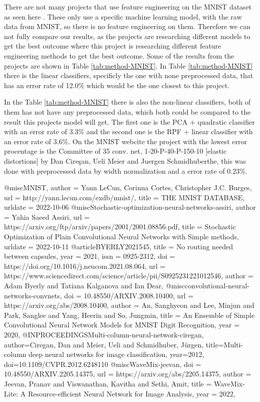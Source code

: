 There are not many projects that use feature engineering on the MNIST dataset as seen here \cite{Stochastic-optimization-neural-networks-assiri, BYERLY2021545, convolutional-neural-networks-convnets, Multi-column-neural-network-ciregan, WaveMix-jeevan}. These only use a specific machine learning model, with the raw data from MNIST, so there is no feature engineering on them. Therefore we can not fully compare our results, as the projects are researching different models to get the best outcome where this project is researching different feature engineering methods to get the best outcome. Some of the results from the projects are shown in Table \ref{tab:method-MNIST}.
In Table \ref{tab:method-MNIST} there is the linear classifiers, specificly the one with none preprocessed data, that has an error rate of 12.0\% which would be the one closest to this project. 

In the Table \ref{tab:method-MNIST} there is also the non-linear classifiers, both of them has not have any preprocessed data, which both could be compared to the result this projects model will get. The first one is the PCA + quadratic classifier with an error rate of 3.3\% and the second one is the RPF + linear classifier with an error rate of 3.6\%. 
On the MNIST webcite \cite{MNIST} the project with the lowest error procentage is the Committee of 35 conv. net, 1-20-P-40-P-150-10 [elastic distortions] by Dan Cireşan, Ueli Meier and Juergen Schmidhuberthe, this was done with preprocessed data by width normalization and a error rate of 0.23\%.

@misc{MNIST,
  author = {Yann LeCun, Corinna Cortes, Christopher J.C. Burges},
  url          = {http://yann.lecun.com/exdb/mnist/},
  title        = {THE MNIST DATABASE},
  urldate      = {2022-10-06}
}
@misc{Stochastic-optimization-neural-networks-assiri,
  author = {Yahia Saeed Assiri},
  url          = {https://arxiv.org/ftp/arxiv/papers/2001/2001.08856.pdf},
  title        = {Stochastic Optimization of Plain Convolutional Neural Networks with Simple methods},
  urldate      = {2022-10-11}
}
@article{BYERLY2021545,
title = {No routing needed between capsules},
year = {2021},
issn = {0925-2312},
doi = {https://doi.org/10.1016/j.neucom.2021.08.064},
url = {https://www.sciencedirect.com/science/article/pii/S0925231221012546},
author = {Adam Byerly and Tatiana Kalganova and Ian Dear},
}
@misc{convolutional-neural-networks-convnets,
  doi = {10.48550/ARXIV.2008.10400},
  url = {https://arxiv.org/abs/2008.10400},
  author = {An, Sanghyeon and Lee, Minjun and Park, Sanglee and Yang, Heerin and So, Jungmin},
  title = {An Ensemble of Simple Convolutional Neural Network Models for MNIST Digit Recognition},
  year = {2020},
}
@INPROCEEDINGS{Multi-column-neural-network-ciregan,  
author={Ciregan, Dan and Meier, Ueli and Schmidhuber, Jürgen},    
title={Multi-column deep neural networks for image classification},   
year={2012},  
doi={10.1109/CVPR.2012.6248110}
}
@misc{WaveMix-jeevan,
  doi = {10.48550/ARXIV.2205.14375},
  url = {https://arxiv.org/abs/2205.14375},
  author = {Jeevan, Pranav and Viswanathan, Kavitha and Sethi, Amit},
  title = {WaveMix-Lite: A Resource-efficient Neural Network for Image Analysis},
  year = {2022},
  }